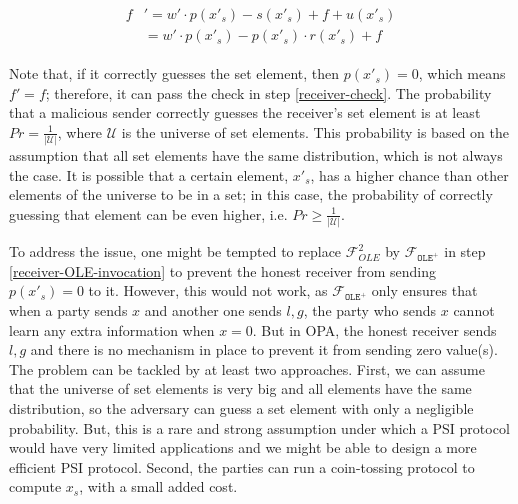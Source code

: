 \begin{align*}
\begin{split}
  f&'= w'\cdot p(x'_{\scriptscriptstyle s})-s(x'_{\scriptscriptstyle s})+f+u(x'_{\scriptscriptstyle s})\\
  &=w'\cdot p(x'_{\scriptscriptstyle s})-p(x'_{\scriptscriptstyle s})\cdot r(x'_{\scriptscriptstyle s})+f
  \end{split}
  \end{align*}
  
  Note that, if it correctly guesses the set element, then $p(x'_{\scriptscriptstyle s})=0$, which means $f'=f$; therefore, it can pass the check in step \ref{receiver-check}. The probability that a malicious sender correctly guesses the receiver's set element is at least $Pr=\frac{1}{|\mathcal{U}|}$, where $\mathcal{U}$ is the universe of set elements. This probability is based on the assumption that all set elements have the same distribution, which is not always the case. It is possible that a certain element, $x'_{\scriptscriptstyle s}$, has a higher chance than other elements of the universe to be in a set; in this case, the probability of correctly guessing that element can be even higher, i.e. $Pr\geq \frac{1}{|\mathcal{U}|}$.

To address the issue, one might be tempted to replace $\mathcal{F}_{\scriptscriptstyle OLE}^{\scriptscriptstyle 2}$ by $ \mathcal{F}_{\mathtt{OLE}^{\scriptscriptstyle +}}$ in step \ref{receiver-OLE-invocation} to prevent the honest  receiver from sending  $p(x'_{\scriptscriptstyle s})=0$ to it. However, this would not work, as $ \mathcal{F}_{\mathtt{OLE}^{\scriptscriptstyle +}}$ only ensures that when a party sends $x$ and another one sends $l,g$, the party who sends $x$ cannot learn any extra information when $x=0$. But in OPA, the honest receiver sends $l,g$ and there is no mechanism in place to prevent it from sending zero value(s). The problem can be tackled by at least two  approaches. First, we can assume that the universe of set elements is very big and all elements have the same distribution, so the adversary can guess a set element with only a negligible probability.  But, this is a rare and  strong assumption under which a PSI protocol would have very limited applications and we might be able to design a more   efficient PSI protocol.  Second, the parties can run a coin-tossing protocol  to compute $x_{\scriptscriptstyle s}$, with a small added  cost. 




